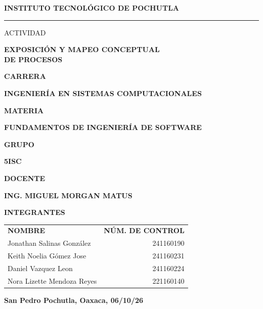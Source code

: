 \documentclass[12pt,letterpaper]{article}
\renewcommand{\arraystretch}{1.35}
\begin{document}
\begin{titlepage}
\thispagestyle{fancy}
\fancyfoot{}
\centering
\vspace*{0cm}
{\sffamily\bfseries\Large\color{verde} INSTITUTO TECNOLÓGICO DE POCHUTLA\par}
\vspace{0.3cm}
{\color{guinda}\rule{0.5\textwidth}{1.2pt}\par}
\vspace{0.5cm}
\begin{center}
{\sffamily\small ACTIVIDAD\par}
\vspace{2pt}
{\sffamily\bfseries\LARGE EXPOSICIÓN Y MAPEO CONCEPTUAL\\DE PROCESOS\par}
\end{center}
\vspace{0.25cm}
{\sffamily\bfseries\color{verde} CARRERA\par}
{\bfseries INGENIERÍA EN SISTEMAS COMPUTACIONALES\par}
\vspace{0.25cm}
{\sffamily\bfseries\color{verde} MATERIA\par}
{\bfseries FUNDAMENTOS DE INGENIERÍA DE SOFTWARE\par}
\vspace{0.25cm}
{\sffamily\bfseries\color{verde} GRUPO\par}
{\bfseries 5ISC\par}
\vspace{0.25cm}
{\sffamily\bfseries\color{verde} DOCENTE\par}
{\bfseries ING. MIGUEL MORGAN MATUS\par}
\vspace{0.3cm}
{\sffamily\bfseries\color{verde} INTEGRANTES\par}
\vspace{2pt}
\renewcommand{\arraystretch}{1.15}
\begin{tabular}{@{}lr@{}}
\sffamily\small\color{guinda}\bfseries NOMBRE & \sffamily\small\color{guinda}\bfseries NÚM. DE CONTROL\\[2pt]
\small Jonathan Salinas González & \small 241160190\\
\small Keith Noelia Gómez Jose & \small 241160231\\
\small Daniel Vazquez Leon & \small 241160224\\
\small Nora Lizette Mendoza Reyes & \small 221160140\\
\end{tabular}
\vfill
{\sffamily\bfseries San Pedro Pochutla, Oaxaca, 06/10/26\par}
\end{titlepage}
\end{document}
